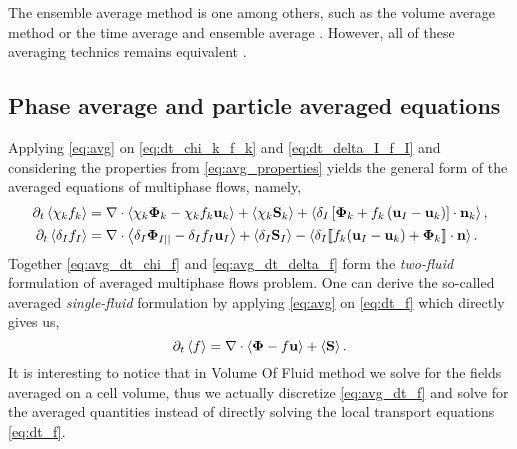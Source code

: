The ensemble average method is one among others, such as the volume average method\citep{jackson1997locally} or the time average
\citep{ishii2010thermo} and ensemble average \citep{zhang1994averaged}. 
However, all of these averaging technics remains equivalent \citep{jackson1997locally}. 

\subsection{Phase average and particle averaged equations}

Applying \ref{eq:avg} on \ref{eq:dt_chi_k_f_k} and \ref{eq:dt_delta_I_f_I} and considering the properties from \ref{eq:avg_properties} yields the general form of the averaged equations of multiphase flows, namely,
\begin{align}
    \partial_t \left<\chi_k f_k\right>
    &= \mathbf{\nabla} \cdot \left<\chi_k \mathbf{\Phi}_k - \chi_k f_k \textbf{u}_k\right>
    + \left<\chi_k \textbf{S}_k\right>
    + \left<\delta_I\left[
        \mathbf{\Phi}_k
        + f_k
        \left(
            \textbf{u}_I
            - \textbf{u}_k
        \right)
    \right]
    \cdot \textbf{n}_k\right> ,
    \label{eq:avg_dt_chi_f}\\
    \partial_t \left<\delta_If_I\right>
    &= 
    \mathbf{\nabla} \cdot \left<\delta_I \mathbf{\Phi}_{I||} - \delta_I f_I \textbf{u}_I\right>
    +\left<\delta_I\textbf{S}_I\right> 
    - \left<\delta_I \llbracket 
    f_k (\textbf{u}_I - \textbf{u}_k)
    + \mathbf{\Phi}_k
     \rrbracket \cdot \textbf{n} \right>.
    \label{eq:avg_dt_delta_f}
\end{align}
Together \ref{eq:avg_dt_chi_f}  and \ref{eq:avg_dt_delta_f} form the \textit{two-fluid} formulation of averaged multiphase flows problem. 
One can derive the so-called averaged \textit{single-fluid} formulation by applying \ref{eq:avg} on \ref{eq:dt_f} which directly gives us, 
\begin{equation}
    \partial_t \left<f\right>
    = \mathbf{\nabla} \cdot \left<\mathbf{\Phi} - f \textbf{u}\right>
    + \left<\textbf{S}\right>.
    \label{eq:avg_dt_f}
\end{equation}
It is interesting to notice that in Volume Of Fluid method we solve for the fields averaged on a cell volume, thus we actually discretize \ref{eq:avg_dt_f} and solve for the averaged quantities \citep{popinet2018numerical,tryggvason2011direct} instead of directly solving the local transport equations \ref{eq:dt_f}.

